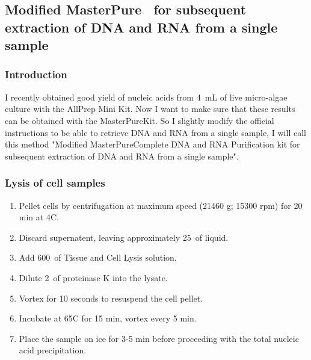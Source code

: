 \subsection{Modified MasterPure\texttrademark~ for subsequent extraction of DNA and RNA from a single sample}
\label{task:20180214_cj0}

\subsubsection{Introduction}

I recently obtained good yield of nucleic acids from 4~mL of live micro-algae culture with the AllPrep Mini Kit. Now I want to make sure that these results can be obtained with the MasterPure\texttrademark Kit. So I slightly modify the official instructions to be able to retrieve DNA and RNA from a single sample, I will call this method "Modified MasterPure\texttrademark Complete DNA and RNA Purification kit for subsequent extraction of DNA and RNA from a single sample".


\subsubsection{Lysis of cell samples}

\begin{enumerate}
\item Pellet cells by centrifugation at maximum speed (21460 g; 15300 rpm) for 20 min at 4\degree C.
\item Discard supernatent, leaving approximately 25~\uL of liquid.
\item Add 600~\uL of Tissue and Cell Lysis solution.
\item Dilute 2~\uL of proteinase K into the lysate.
\item Vortex for 10 seconds to resuspend the cell pellet.
\item Incubate at 65\degree C for 15 min, vortex every 5 min.
\item Place the sample on ice for 3-5 min before proceeding with the total nucleic acid precipitation.
\end{enumerate}

